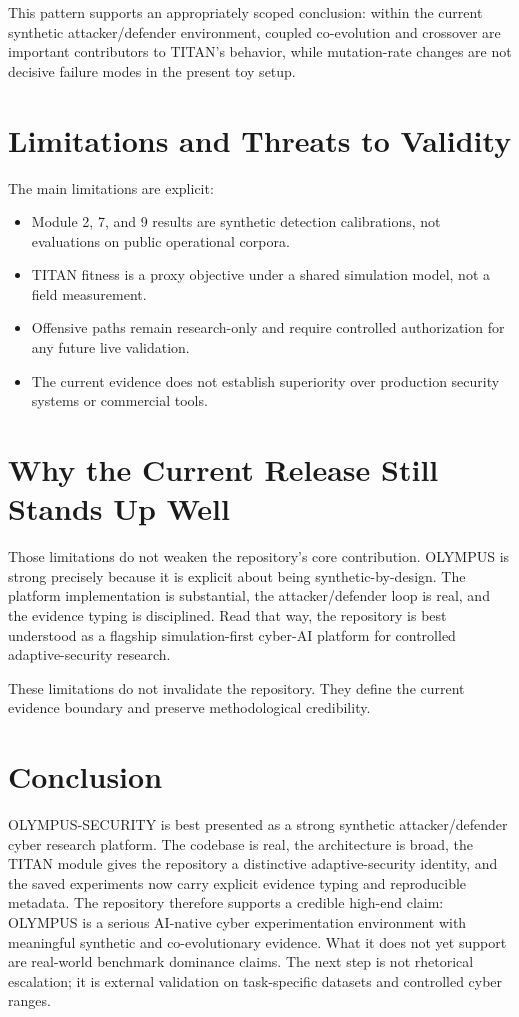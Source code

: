 \documentclass[conference]{IEEEtran}
\begin{document}
This pattern supports an appropriately scoped conclusion: within the current
synthetic attacker/defender environment, coupled co-evolution and crossover are
important contributors to TITAN's behavior, while mutation-rate changes are not
decisive failure modes in the present toy setup.

\section{Limitations and Threats to Validity}

The main limitations are explicit:
\begin{itemize}
  \item Module 2, 7, and 9 results are synthetic detection calibrations, not evaluations on public operational corpora.
  \item TITAN fitness is a proxy objective under a shared simulation model, not a field measurement.
  \item Offensive paths remain research-only and require controlled authorization for any future live validation.
  \item The current evidence does not establish superiority over production security systems or commercial tools.
\end{itemize}

\section{Why the Current Release Still Stands Up Well}
Those limitations do not weaken the repository's core contribution. OLYMPUS is
strong precisely because it is explicit about being synthetic-by-design. The
platform implementation is substantial, the attacker/defender loop is real, and
the evidence typing is disciplined. Read that way, the repository is best
understood as a flagship simulation-first cyber-AI platform for controlled
adaptive-security research.

These limitations do not invalidate the repository. They define the current
evidence boundary and preserve methodological credibility.

\section{Conclusion}

OLYMPUS-SECURITY is best presented as a strong synthetic attacker/defender cyber
research platform. The codebase is real, the architecture is broad, the TITAN
module gives the repository a distinctive adaptive-security identity, and the
saved experiments now carry explicit evidence typing and reproducible metadata.
The repository therefore supports a credible high-end claim: OLYMPUS is a
serious AI-native cyber experimentation environment with meaningful synthetic and
co-evolutionary evidence. What it does not yet support are real-world benchmark
dominance claims. The next step is not rhetorical escalation; it is external
validation on task-specific datasets and controlled cyber ranges.
\end{document}
